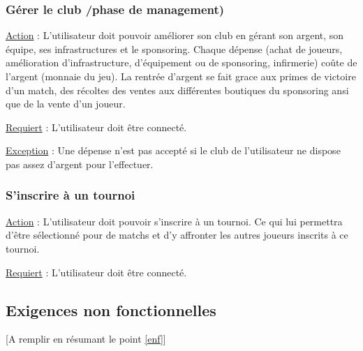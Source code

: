 \documentclass[a4paper]{article}
\begin{document}
\subsubsection{Gérer le club /phase de management)}
\begin{description}[leftmargin=*] %
\item \underline{Action} : L'utilisateur doit pouvoir améliorer son club en gérant son argent, son équipe, ses infrastructures et le sponsoring. Chaque dépense (achat de joueurs, amélioration d'infrastructure, d'équipement ou de sponsoring, infirmerie) coûte de l'argent (monnaie du jeu). La rentrée d'argent se fait grace aux primes de victoire d'un match, des récoltes des ventes aux différentes boutiques du sponsoring ansi que de la vente d'un joueur.
\item \underline{Requiert} : L'utilisateur doit être connecté.
\item \underline{Exception} : Une dépense n'est pas accepté si le club de l'utilisateur ne dispose pas assez d'argent pour l'effectuer.
\end{description} %

\subsubsection{S'inscrire à un tournoi}
\begin{description}[leftmargin=*] %
\item \underline{Action} : L'utilisateur doit pouvoir s'inscrire à un tournoi.
Ce qui lui permettra d'être sélectionné pour de matchs et d'y affronter les autres joueurs inscrits à ce tournoi.
\item \underline{Requiert} : L'utilisateur doit être connecté.
\end{description} %


\subsection{Exigences non fonctionnelles}
[A remplir en résumant le point \ref{enf}]

\end{document}
